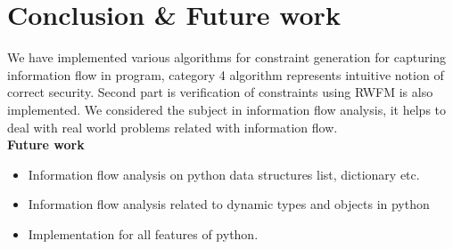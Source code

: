 \chapter{Conclusion \& Future work}
\label{ch:conclusion}
We have implemented various algorithms for constraint generation for capturing information flow in program, category 4 algorithm represents intuitive notion of correct security. Second part is verification of constraints using RWFM \cite{rwfm} is also implemented. We considered the subject in information flow analysis, it helps to deal with real world problems related with information flow.\\
\textbf{Future work}
\begin{itemize}
	\item Information flow analysis on python data structures list, dictionary etc.
	\item Information flow analysis related to dynamic types and objects in python
	\item Implementation for all features of python.  
\end{itemize} 

